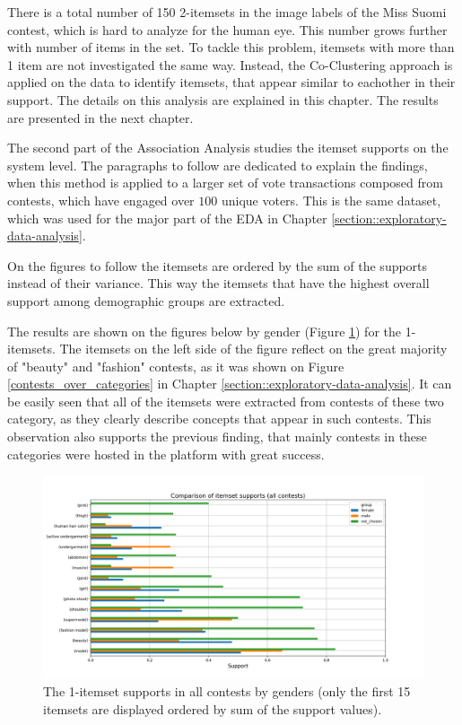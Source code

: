 There is a total number of 150 2-itemsets in the image labels of the Miss Suomi contest, which is hard to analyze for the human eye. This number grows further with number of items in the set. To tackle this problem, itemsets with more than 1 item are not investigated the same way. Instead, the Co-Clustering approach is applied on the data to identify itemsets, that appear similar to eachother in their support. The details on this analysis are explained in this chapter. The results are presented in the next chapter.

The second part of the Association Analysis studies the itemset supports on the system level. The paragraphs to follow are dedicated to explain the findings, when this method is applied to a larger set of vote transactions composed from contests, which have engaged over $100$ unique voters. This is the same dataset, which was used for the major part of the EDA in Chapter \ref{section::exploratory-data-analysis}. 

On the figures to follow the itemsets are ordered by the sum of the supports instead of their variance. This way the itemsets that have the highest overall support among demographic groups are extracted.

The results are shown on the figures below by gender (Figure \ref{itemset_supports-gender-all_contests-1_itemset}) for the 1-itemsets. The itemsets on the left side of the figure reflect on the great majority of "beauty" and "fashion" contests, as it was shown on Figure \ref{contests_over_categories} in Chapter \ref{section::exploratory-data-analysis}. It can be easily seen that all of the itemsets were extracted from contests of these two category, as they clearly describe concepts that appear in such contests. This observation also supports the previous finding, that mainly contests in these categories were hosted in the platform with great success.

\begin{figure}[h] 
    \begin{center}
        \includegraphics[width=1.0\textwidth]{Images/itemset_supports-gender-all_contests-1_itemset.png}
        \caption{The 1-itemset supports in all contests by genders (only the first 15 itemsets are displayed ordered by sum of the support values).}
        \label{itemset_supports-gender-all_contests-1_itemset}
    \end{center}
\end{figure}

